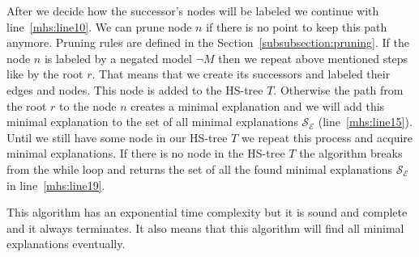 \documentclass[12pt,a4paper]{article}
\begin{document}
After we decide how the successor's nodes will be labeled we continue with line~\ref{mhs:line10}. We can prune node $n$ if there is no point to keep this path anymore. Pruning rules are defined in the Section~\ref{subsubsection:pruning}. If the node $n$ is labeled by a negated model $\neg M$ then we repeat above mentioned steps like by the root $r$. That means that we create its successors and labeled their edges and nodes. This node is added to the HS-tree $T$. Otherwise the path from the root $r$ to the node $n$ creates a minimal explanation and we will add this minimal explanation to the set of all minimal explanations $\mathcal{S}_{\mathcal{E}}$ (line~\ref{mhs:line15}). Until we still have some node in our HS-tree $T$ we repeat this process and acquire minimal explanations. If there is no node in the HS-tree $T$ the algorithm breaks from the while loop and returns the set of all the found minimal explanations $\mathcal{S}_{\mathcal{E}}$ in line~\ref{mhs:line19}.

This algorithm has an exponential time complexity but it is sound and complete and it always terminates. It also means that this algorithm will find all minimal explanations eventually.
\end{document}
